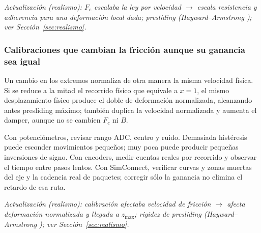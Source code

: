 \textit{Actualización (realismo): $F_c$ escalaba la ley por velocidad $\rightarrow$ escala resistencia y adherencia para una deformación local dada; presliding (Hayward--Armstrong \cite{hayward2000}); ver Sección~\ref{sec:realismo}.}

\subsubsection{Calibraciones que cambian la fricción aunque su ganancia sea igual}
Un cambio en los extremos normaliza de otra manera la misma velocidad física. Si se reduce a la mitad el recorrido físico que equivale a $x=1$, el mismo desplazamiento físico produce el doble de deformación normalizada, alcanzando antes presliding máximo; también duplica la velocidad normalizada y aumenta el damper, aunque no se cambien $F_c$ ni $B$.

Con potenciómetros, revisar rango ADC, centro y ruido. Demasiada histéresis puede esconder movimientos pequeños; muy poca puede producir pequeñas inversiones de signo. Con encoders, medir cuentas reales por recorrido y observar el tiempo entre pasos lentos. Con SimConnect, verificar curvas y zonas muertas del eje y la cadencia real de paquetes; corregir sólo la ganancia no elimina el retardo de esa ruta.

\textit{Actualización (realismo): calibración afectaba velocidad de fricción $\rightarrow$ afecta deformación normalizada y llegada a $z_{\max}$; rigidez de presliding (Hayward--Armstrong \cite{hayward2000}); ver Sección~\ref{sec:realismo}.}

